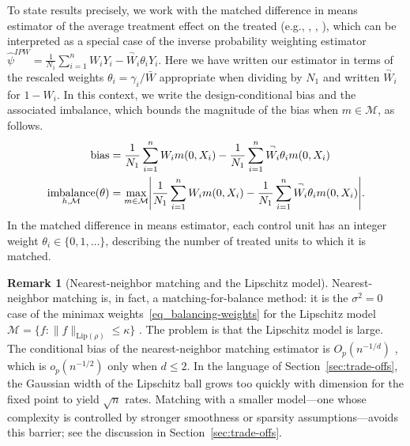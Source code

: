 \documentclass{article}
\DeclarePairedDelimiter\abs{\lvert}{\rvert}
\theoremstyle{definition}
\newtheorem{remark}{Remark}
\DeclareMathOperator{\imbalance}{imbalance}
\newcommand{\model}{\mathcal{M}}
\newcommand{\<}{\langle}
\renewcommand{\>}{\rangle}
\begin{document}
To state results precisely, we work with the matched difference in means estimator of the average treatment effect on the treated (e.g., \citealt{rosenbaum1985constructing}, \citealt{abadie2006large}, \citealt{zubizarreta2014matching}), which can be interpreted as a special case of the inverse probability weighting estimator $\hat\psi^{IPW}=\frac{1}{N_1} \sum_{i=1}^n W_i Y_i - \overset{\neg}{W}_i \theta_i Y_i$. Here we have written our estimator in terms of the rescaled weights $\theta_i=\gamma_i / \bar W$ appropriate when dividing by $N_1$ and written $\overset{\neg}W_i$ for $1-W_i$.
In this context, we write the design-conditional bias and the associated imbalance, which bounds the magnitude of the bias when $m \in \model$, as follows.
\begin{equation}
\label{eq:att-imbalance}
\begin{aligned}
\text{bias} &=  \frac{1}{N_1}\sum_{i=1}^n W_i m(0,X_i) - \frac{1}{N_1}\sum_{i=1}^n \overset{\neg}{W_i}\theta_i m(0, X_i) \\
\imbalance_{h,\model}(\theta) &= \max_{m \in \model} \abs*{ \frac{1}{N_1}\sum_{i=1}^n W_i m(0,X_i) - \frac{1}{N_1}\sum_{i=1}^n \overset{\neg}{W_i}\theta_i m(0, X_i)}.
\end{aligned}
\end{equation}
In the matched difference in means estimator, each control unit has an integer weight $\theta_i \in \{0, 1, \ldots\}$, describing the number of treated units to which it is matched.

\begin{remark}[Nearest-neighbor matching and the Lipschitz model]
Nearest-neighbor matching is, in fact, a matching-for-balance method: it is the $\sigma^2=0$ case of the minimax weights~\eqref{eq_balancing-weights} for the Lipschitz model $\model = \{f : \|f\|_{\text{Lip}(\rho)} \le \kappa\}$ \citep[Theorem 3]{kallus2020generalized}. The problem is that the Lipschitz model is large. The conditional bias of the nearest-neighbor matching estimator is $O_p(n^{-1/d})$ \citep[Theorem 1]{abadie2006large}, which is $o_p(n^{-1/2})$ only when $d \le 2$. In the language of Section~\ref{sec:trade-offs}, the Gaussian width of the Lipschitz ball grows too quickly with dimension for the fixed point to yield $\sqrt{n}$ rates. Matching with a smaller model---one whose complexity is controlled by stronger smoothness or sparsity assumptions---avoids this barrier; see the discussion in Section~\ref{sec:trade-offs}.
\end{remark}
\end{document}
